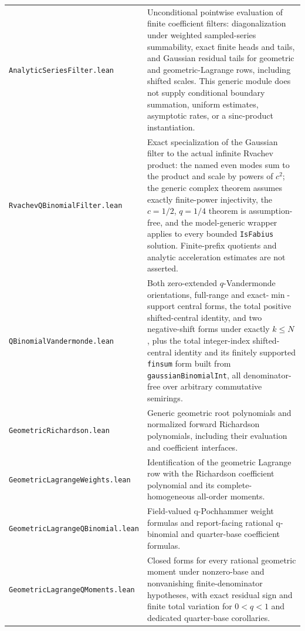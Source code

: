 \documentclass[11pt,oneside]{article}
\theoremstyle{definition}
\theoremstyle{remark}
\begin{document}
\begin{longtable}{>{\raggedright\arraybackslash}p{} >{\raggedright\arraybackslash}p{}}
\nolinkurl{AnalyticSeriesFilter.lean} & Unconditional pointwise evaluation of finite coefficient filters: diagonalization under weighted sampled-series summability, exact finite heads and tails, and Gaussian residual tails for geometric and geometric-Lagrange rows, including shifted scales.  This generic module does not supply conditional boundary summation, uniform estimates, asymptotic rates, or a sinc-product instantiation. \\
\nolinkurl{RvachevQBinomialFilter.lean} & Exact specialization of the Gaussian filter to the actual infinite Rvachev product: the named even modes sum to the product and scale by powers of \(c^2\); the generic complex theorem assumes exactly finite-power injectivity, the \(c=1/2\), \(q=1/4\) theorem is assumption-free, and the model-generic wrapper applies to every bounded \nolinkurl{IsFabius} solution.  Finite-prefix quotients and analytic acceleration estimates are not asserted. \\
\nolinkurl{QBinomialVandermonde.lean} & Both zero-extended \(q\)-Vandermonde orientations, full-range and exact-\(\min\)-support central forms, the total positive shifted-central identity, and two negative-shift forms under exactly \(k\leq N\), plus the total integer-index shifted-central identity and its finitely supported \nolinkurl{finsum} form built from \nolinkurl{gaussianBinomialInt}, all denominator-free over arbitrary commutative semirings. \\
\nolinkurl{GeometricRichardson.lean} & Generic geometric root polynomials and normalized forward Richardson polynomials, including their evaluation and coefficient interfaces. \\
\nolinkurl{GeometricLagrangeWeights.lean} & Identification of the geometric Lagrange row with the Richardson coefficient polynomial and its complete-homogeneous all-order moments. \\
\nolinkurl{GeometricLagrangeQBinomial.lean} & Field-valued q-Pochhammer weight formulas and report-facing rational q-binomial and quarter-base coefficient formulas. \\
\nolinkurl{GeometricLagrangeQMoments.lean} & Closed forms for every rational geometric moment under nonzero-base and nonvanishing finite-denominator hypotheses, with exact residual sign and finite total variation for \(0<q<1\) and dedicated quarter-base corollaries. \\

\end{longtable}
\end{document}
